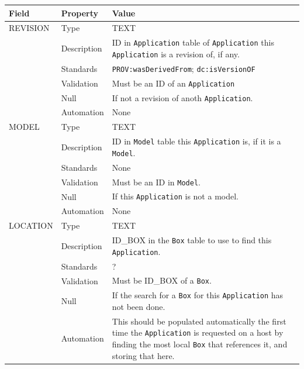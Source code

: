 \documentclass[
]{article}
\newcounter{none}
\begin{document}
{\def\LTcaptype{none} 
\begin{longtable}[]{@{}
  >{\raggedright\arraybackslash}p{}
  >{\raggedright\arraybackslash}p{}
  >{\raggedright\arraybackslash}p{}@{}}
\toprule\noalign{}
\begin{minipage}[b]{\linewidth}\raggedright
Field
\end{minipage} & \begin{minipage}[b]{\linewidth}\raggedright
Property
\end{minipage} & \begin{minipage}[b]{\linewidth}\raggedright
Value
\end{minipage} \\
\midrule\noalign{}
\endhead
\bottomrule\noalign{}
\endlastfoot
REVISION & Type & TEXT \\
& Description & ID in \texttt{Application} table of \texttt{Application}
this \texttt{Application} is a revision of, if any. \\
& Standards & \texttt{PROV:wasDerivedFrom}; \texttt{dc:isVersionOF} \\
& Validation & Must be an ID of an \texttt{Application} \\
& Null & If not a revision of anoth \texttt{Application}. \\
& Automation & None \\
MODEL & Type & TEXT \\
& Description & ID in \texttt{Model} table this \texttt{Application} is,
if it is a \texttt{Model}. \\
& Standards & None \\
& Validation & Must be an ID in \texttt{Model}. \\
& Null & If this \texttt{Application} is not a model. \\
& Automation & None \\
LOCATION & Type & TEXT \\
& Description & ID\_BOX in the \texttt{Box} table to use to find this
\texttt{Application}. \\
& Standards & ? \\
& Validation & Must be ID\_BOX of a \texttt{Box}. \\
& Null & If the search for a \texttt{Box} for this \texttt{Application}
has not been done. \\
& Automation & This should be populated automatically the first time the
\texttt{Application} is requested on a host by finding the most local
\texttt{Box} that references it, and storing that here. \\
\end{longtable}
}
\end{document}
